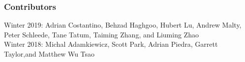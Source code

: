 \documentclass[twoside]{article}
\begin{document}
\printbibliography

\subsubsection*{Contributors}
Winter 2019: Adrian Costantino, Behzad Haghgoo, Hubert Lu, Andrew Malty, Peter Schleede, Tane Tatum, Taiming Zhang, and Liuming Zhao   \\
Winter 2018: Michal Adamkiewicz, Scott Park, Adrian Piedra, Garrett Taylor,and Matthew Wu Tsao  
\end{document}
